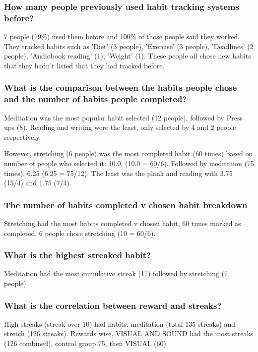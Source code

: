 

\subsubsection*{How many people previously used habit tracking systems before?}
7 people (19\%) used them before and 100\% of those people said they worked. They tracked habits such as 'Diet' (3 people), 'Exercise' (3 people), 'Deadlines' (2 people), 'Audiobook reading' (1), 'Weight' (1). These people all chose new habits that they hadn't listed that they had tracked before.

\subsubsection*{What is the comparison between the habits people chose and the number of habits people completed?}
Meditation was the most popular habit selected (12 people), followed by Press ups (8). Reading and writing were the least, only selected by 4 and 2 people respectively.

However, stretching (6 people) was the most completed habit (60 times) based on number of people who selected it: 10.0, (10.0 = 60/6). Followed by meditation (75 times), 6.25 (6.25 = 75/12). The least was the plank and reading with 3.75 (15/4) and 1.75 (7/4).

\subsubsection*{The number of habits completed v chosen habit breakdown}
Stretching had the most habits completed v chosen habit, 60 times marked as completed, 6 people chose stretching (10 = 60/6).



\subsubsection*{What is the highest streaked habit?}
Meditation had the most cumulative streak (17) followed by stretching (7 people).

\subsubsection*{What is the correlation between reward and streaks?}
High streaks (streak over 10) had habits: meditation (total 135 streaks) and stretch (126 streaks). Rewards wise, VISUAL AND SOUND had the most streaks (126 combined), control group 75, then VISUAL (60)

